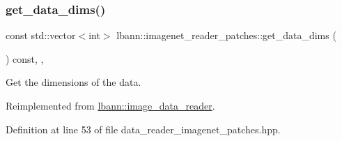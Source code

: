 \mbox{\label{classlbann_1_1imagenet__reader__patches_a4d5c6b9780908d9beb5c6d3f017c38b5}} 
\subsubsection{\texorpdfstring{get\+\_\+data\+\_\+dims()}{get\_data\_dims()}}
{\footnotesize\ttfamily const std\+::vector$<$int$>$ lbann\+::imagenet\+\_\+reader\+\_\+patches\+::get\+\_\+data\+\_\+dims (\begin{DoxyParamCaption}{ }\end{DoxyParamCaption}) const\hspace{0.3cm}{\ttfamily [inline]}, {\ttfamily [override]}, {\ttfamily [virtual]}}



Get the dimensions of the data. 



Reimplemented from \hyperlink{classlbann_1_1image__data__reader_a1bb05018e059afae76d46a2a908dd75c}{lbann\+::image\+\_\+data\+\_\+reader}.



Definition at line 53 of file data\+\_\+reader\+\_\+imagenet\+\_\+patches.\+hpp.


